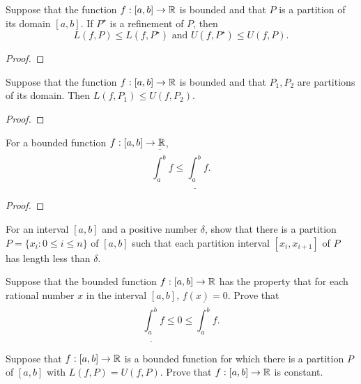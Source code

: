 \documentclass[letterpaper, twoside, 12pt]{book}
\begin{document}
\begin{lemma}
  Suppose that the function \(f:[a,b]\to\mathbb R\) is bounded and that \(P\)
  is a partition of its domain \([a,b]\). If \(P^\star\) is a refinement
  of \(P\), then
  \[
    L(f,P)\leq L(f,P^\star)
      \text{ and }
    U(f,P^\star)\leq U(f,P)
  .\]
\end{lemma}
\begin{proof}

\end{proof}


\begin{lemma}[6.3]
  Suppose that the function \(f:[a,b]\to\mathbb R\) is bounded and that
  \(P_1,P_2\) are partitions of its domain. Then \(L(f,P_1)\leq U(f,P_2)\).
\end{lemma}
\begin{proof}

\end{proof}


\begin{lemma}[6.4]
  For a bounded function \(f:[a,b]\to\mathbb R\),
  \[
    \overline{\int_a^b} f
      \leq
    \underline{\int_a^b} f
  .\]
\end{lemma}
\begin{proof}

\end{proof}

\begin{exercise}[2]
  For an interval \([a,b]\) and a positive number \(\delta\),
  show that there is a partition \(P=\{x_i:0\leq i\leq n\}\) of
  \([a,b]\) such that each partition interval \([x_i,x_{i+1}]\)
  of \(P\) has length less than \(\delta\).
\end{exercise}
\begin{solution}

\end{solution}


\begin{exercise}[3]
  Suppose that the bounded function \(f:[a,b]\to\mathbb R\) has the property
  that for each rational number \(x\) in the interval \([a,b]\),
  \(f(x)=0\). Prove that
  \[
    \underline{\int_a^b}f
      \leq
    0
      \leq
    \overline{\int_a^b}f
  .\]
\end{exercise}
\begin{solution}

\end{solution}


\begin{exercise}[6]
  Suppose that \(f:[a,b]\to\mathbb R\) is a bounded function for which there is
  a partition \(P\) of \([a,b]\) with \(L(f,P)=U(f,P)\). Prove that
  \(f:[a,b]\to\mathbb R\) is constant.
\end{exercise}
\begin{solution}

\end{solution}
\end{document}
